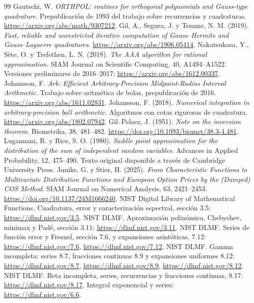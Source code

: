 \documentclass[11pt,a4paper]{article}
\theoremstyle{definition}
\begin{document}
\begin{thebibliography}{99}
 Gautschi, W. \textit{ORTHPOL: routines for orthogonal polynomials and Gauss-type quadrature}. Prepublicación de 1993 del trabajo sobre recurrencias y cuadraturas. \url{https://arxiv.org/abs/math/9307212}.
 Gil, A., Segura, J. y Temme, N. M. (2019). \textit{Fast, reliable and unrestricted iterative computation of Gauss--Hermite and Gauss--Laguerre quadratures}. \url{https://arxiv.org/abs/1906.05414}.
 Nakatsukasa, Y., Sète, O. y Trefethen, L. N. (2018). \textit{The AAA algorithm for rational approximation}. SIAM Journal on Scientific Computing, 40, A1494--A1522. Versiones preliminares de 2016--2017: \url{https://arxiv.org/abs/1612.00337}.
 Johansson, F. \textit{Arb: Efficient Arbitrary-Precision Midpoint-Radius Interval Arithmetic}. Trabajo sobre aritmética de bolas, prepublicación de 2016. \url{https://arxiv.org/abs/1611.02831}.
 Johansson, F. (2018). \textit{Numerical integration in arbitrary-precision ball arithmetic}. Algoritmos con cotas rigurosas de cuadratura. \url{https://arxiv.org/abs/1802.07942}.
 Gil--Pelaez, J. (1951). \textit{Note on the inversion theorem}. Biometrika, 38, 481--482. \url{https://doi.org/10.1093/biomet/38.3-4.481}.
 Lugannani, R. y Rice, S. O. (1980). \textit{Saddle point approximation for the distribution of the sum of independent random variables}. Advances in Applied Probability, 12, 475--490. Texto original disponible a través de Cambridge University Press.
 Junike, G. y Stier, H. (2025). \textit{From Characteristic Functions to Multivariate Distribution Functions and European Option Prices by the (Damped) COS Method}. SIAM Journal on Numerical Analysis, 63, 2421--2453. \url{https://doi.org/10.1137/24M1666240}.
 NIST Digital Library of Mathematical Functions. Cuadratura, error y caracterización espectral, sección 3.5: \url{https://dlmf.nist.gov/3.5}.
 NIST DLMF. Aproximación polinómica, Chebyshev, minimax y Padé, sección 3.11: \url{https://dlmf.nist.gov/3.11}.
 NIST DLMF. Series de función error y Fresnel, sección 7.6, y expansiones asintóticas, 7.12: \url{https://dlmf.nist.gov/7.6}, \url{https://dlmf.nist.gov/7.12}.
 NIST DLMF. Gamma incompleta: series 8.7, fracciones continuas 8.9 y expansiones uniformes 8.12: \url{https://dlmf.nist.gov/8.7}, \url{https://dlmf.nist.gov/8.9}, \url{https://dlmf.nist.gov/8.12}.
 NIST DLMF. Beta incompleta, series, recurrencias y fracciones continuas, 8.17: \url{https://dlmf.nist.gov/8.17}. Integral exponencial y series: \url{https://dlmf.nist.gov/6.6}.

\end{thebibliography}
\end{document}
